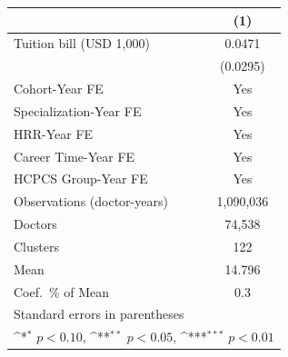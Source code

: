 {
\def\sym#1{\ifmmode^{#1}\else\(^{#1}\)\fi}
\begin{tabular}{l*{1}{c}}
\hline\hline
                    &\multicolumn{1}{c}{(1)}         \\
\hline
Tuition bill (USD 1,000)&      0.0471         \\
                    &    (0.0295)         \\
[1em]
Cohort-Year FE      &         Yes         \\
[1em]
Specialization-Year FE&         Yes         \\
[1em]
HRR-Year FE         &         Yes         \\
[1em]
Career Time-Year FE &         Yes         \\
[1em]
HCPCS Group-Year FE &         Yes         \\
\hline
Observations (doctor-years)&   1,090,036         \\
Doctors             &      74,538         \\
Clusters            &         122         \\
Mean                &      14.796         \\
Coef.\ \% of Mean   &         0.3         \\
\hline\hline
\multicolumn{2}{l}{\footnotesize Standard errors in parentheses}\\
\multicolumn{2}{l}{\footnotesize \sym{*} \(p<0.10\), \sym{**} \(p<0.05\), \sym{***} \(p<0.01\)}\\
\end{tabular}
}
